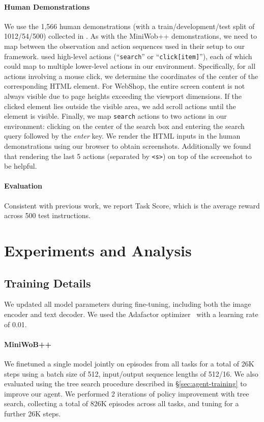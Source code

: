 \paragraph{Human Demonstrations}
We use the 1,566 human demonstrations (with a train/development/test split of 1012/54/500) collected in \citet{yao2022webshop}. As with the MiniWob++ demonstrations, we need to map between the observation and action sequences used in their setup to our framework. \citet{yao2022webshop} used high-level actions (\eg ``\texttt{search}'' or ``\texttt{click[item]}''), each of which could map to multiple lower-level actions in our environment.
Specifically, for all actions involving a mouse click, we determine the coordinates of the center of the corresponding HTML element. For WebShop, the entire screen content is not always visible due to page heights exceeding the viewport dimensions. If the clicked element lies outside the visible area, we add scroll actions until the element is visible. Finally, we map \texttt{search} actions to two actions in our environment: clicking on the center of the search box and entering the search query followed by the \emph{enter} key. We render the HTML inputs in the human demonstrations using our browser to obtain screenshots. Additionally we found that rendering the last 5 actions (separated by \texttt{<s>}) on top of the screenshot to be helpful.

\paragraph{Evaluation}
Consistent with previous work, we report Task Score, which is the average reward across 500 test instructions.

\section{Experiments and Analysis}



\subsection{Training Details}

 We updated all model parameters during fine-tuning, including both the image encoder and text decoder. We used the Adafactor optimizer~\citep{shazeer2018adafactor}  with a learning rate of 0.01.
 
\label{sec:train-details}
\paragraph{MiniWoB++} We finetuned a single model jointly on episodes from all tasks for a total of 26K steps using a batch size of 512, input/output sequence lengths of 512/16. We also evaluated using the tree search procedure described in \S\ref{sec:agent-training} to improve our agent. We performed 2 iterations of policy improvement with tree search, collecting a total of 826K episodes across all tasks, and tuning for a further 26K steps.

